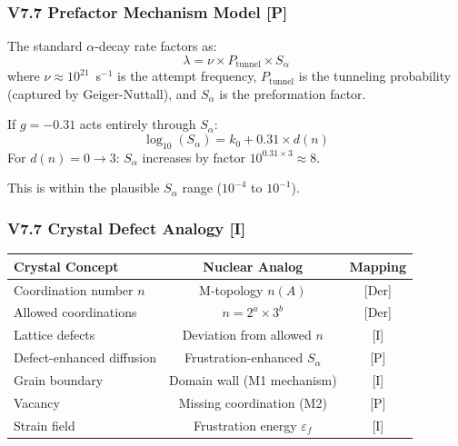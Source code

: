 \subsubsection{V7.7 Prefactor Mechanism Model [P]}
\label{subsubsec:v77-prefactor}

The standard $\alpha$-decay rate factors as:
\begin{equation}
    \lambda = \nu \times P_{\text{tunnel}} \times S_\alpha
    \label{eq:decay-rate-factorization}
\end{equation}
where $\nu \approx 10^{21}$~s$^{-1}$ is the attempt frequency, $P_{\text{tunnel}}$ is the tunneling probability (captured by Geiger-Nuttall), and $S_\alpha$ is the preformation factor.

If $g = -0.31$ acts entirely through $S_\alpha$:
\begin{equation}
    \log_{10}(S_\alpha) = k_0 + 0.31 \times d(n)
\end{equation}
For $d(n) = 0 \to 3$: $S_\alpha$ increases by factor $10^{0.31 \times 3} \approx 8$.

This is within the plausible $S_\alpha$ range ($10^{-4}$ to $10^{-1}$).

\subsubsection{V7.7 Crystal Defect Analogy [I]}
\label{subsubsec:v77-crystal}

\begin{tcolorbox}[colback=blue!5!white, colframe=blue!75!black, title=Crystal--Nucleus Mapping]
\begin{center}
\begin{tabular}{lcc}
\hline
\textbf{Crystal Concept} & \textbf{Nuclear Analog} & \textbf{Mapping} \\
\hline
Coordination number $n$ & M-topology $n(A)$ & [Der] \\
Allowed coordinations & $n = 2^a \times 3^b$ & [Der] \\
Lattice defects & Deviation from allowed $n$ & [I] \\
Defect-enhanced diffusion & Frustration-enhanced $S_\alpha$ & [P] \\
Grain boundary & Domain wall (M1 mechanism) & [I] \\
Vacancy & Missing coordination (M2) & [P] \\
Strain field & Frustration energy $\varepsilon_f$ & [I] \\
\hline
\end{tabular}
\end{center}
\end{tcolorbox}

